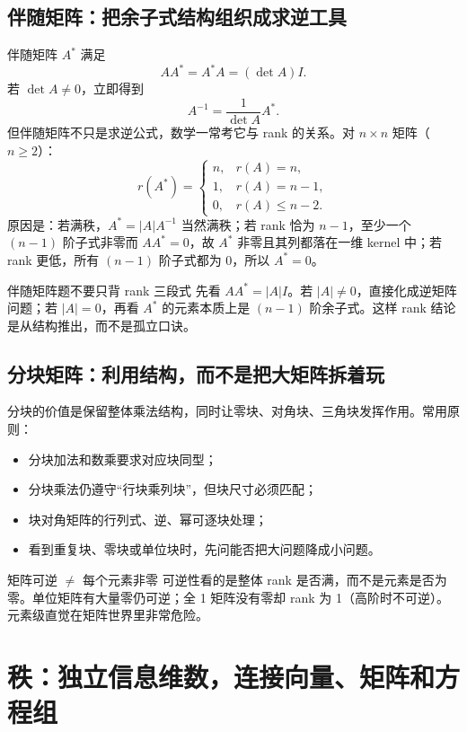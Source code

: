 \documentclass[11pt,a4paper,openany]{ctexbook}
\begin{document}
\section{伴随矩阵：把余子式结构组织成求逆工具}
伴随矩阵 $A^*$ 满足
\[
AA^*=A^*A=(\det A)I.
\]
若 $\det A\neq0$，立即得到
\[
A^{-1}=\frac{1}{\det A}A^*.
\]
但伴随矩阵不只是求逆公式，数学一常考它与 rank 的关系。对 $n\times n$ 矩阵（$n\ge2$）：
\[
r(A^*)=
\begin{cases}
 n,&r(A)=n,\\
 1,&r(A)=n-1,\\
 0,&r(A)\le n-2.
\end{cases}
\]
原因是：若满秩，$A^*=\lvert A\rvert A^{-1}$ 当然满秩；若 rank 恰为 $n-1$，至少一个 $(n-1)$ 阶子式非零而 $AA^*=0$，故 $A^*$ 非零且其列都落在一维 kernel 中；若 rank 更低，所有 $(n-1)$ 阶子式都为 0，所以 $A^*=0$。

\begin{examBox}{伴随矩阵题不要只背 rank 三段式}
先看 $AA^*=\lvert A\rvert I$。若 $\lvert A\rvert\neq0$，直接化成逆矩阵问题；若 $\lvert A\rvert=0$，再看 $A^*$ 的元素本质上是 $(n-1)$ 阶余子式。这样 rank 结论是从结构推出，而不是孤立口诀。
\end{examBox}

\section{分块矩阵：利用结构，而不是把大矩阵拆着玩}
分块的价值是保留整体乘法结构，同时让零块、对角块、三角块发挥作用。常用原则：
\begin{itemize}
  \item 分块加法和数乘要求对应块同型；
  \item 分块乘法仍遵守“行块乘列块”，但块尺寸必须匹配；
  \item 块对角矩阵的行列式、逆、幂可逐块处理；
  \item 看到重复块、零块或单位块时，先问能否把大问题降成小问题。
\end{itemize}

\begin{boundarybox}{矩阵可逆 $\neq$ 每个元素非零}
可逆性看的是整体 rank 是否满，而不是元素是否为零。单位矩阵有大量零仍可逆；全 1 矩阵没有零却 rank 为 1（高阶时不可逆）。元素级直觉在矩阵世界里非常危险。
\end{boundarybox}

\chapter{秩：独立信息维数，连接向量、矩阵和方程组}
\end{document}
